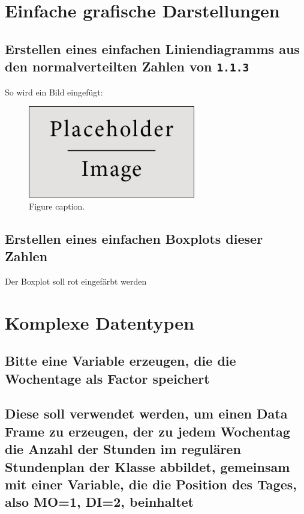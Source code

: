 \documentclass{article}
\begin{document}
\section{Einfache grafische Darstellungen}

\subsection{Erstellen eines einfachen Liniendiagramms aus den normalverteilten Zahlen von \texttt{1.1.3}}

So wird ein Bild eingefügt:

\begin{figure}[H]
	\begin{center}
		\includegraphics[width=0.65\textwidth]{placeholder} %
		\caption{Figure caption.}
	\end{center}
\end{figure}

\subsection{Erstellen eines einfachen Boxplots dieser Zahlen}


Der Boxplot soll rot eingefärbt werden


\section{Komplexe Datentypen}

\subsection{Bitte eine Variable erzeugen, die die Wochentage als Factor speichert}

\subsection{Diese soll verwendet werden, um einen Data Frame zu erzeugen, der zu jedem Wochentag die Anzahl der Stunden im regulären Stundenplan der Klasse abbildet, gemeinsam mit einer Variable, die die Position des Tages, also MO=1, DI=2, beinhaltet}
\end{document}
